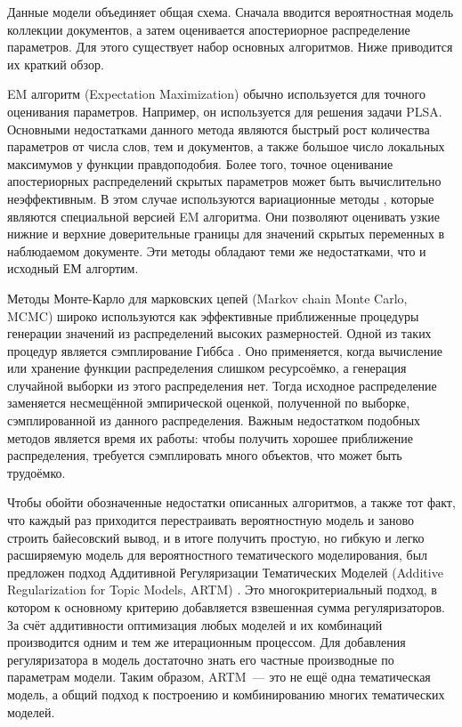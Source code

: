 \documentclass[12pt, twoside]{article}
\begin{document}
Данные модели объединяет общая схема. Сначала вводится вероятностная модель коллекции документов, а затем оценивается  апостериорное распределение  параметров. Для этого существует набор основных алгоритмов. Ниже приводится их краткий обзор.

EM алгоритм (Expectation Maximization) \cite{bilmes1998gentle} обычно используется для  точного оценивания параметров. Например, он используется для решения задачи PLSA. Основными недостатками данного метода являются быстрый рост количества параметров от числа слов, тем и документов, а также большое число локальных максимумов у функции правдоподобия. Более того, точное оценивание апостериорных распределений скрытых параметров может быть вычислительно неэффективным. В этом случае используются вариационные методы \cite{jordan1999introduction}, которые являются специальной версией EM алгоритма. Они  позволяют оценивать узкие нижние и верхние доверительные границы для значений скрытых переменных в наблюдаемом документе. Эти методы обладают теми же недостатками, что и исходный ЕМ алгортим.

Методы Монте-Карло для марковских цепей (Markov chain Monte Carlo, MCMC) \cite{gilks1996introducing,andrieu2003introduction} широко используются как эффективные приближенные процедуры генерации значений из распределений высоких размерностей. Одной из таких процедур является сэмплирование Гиббса \cite{griffiths2004finding}.  Оно применяется, когда вычисление или хранение функции распределения слишком ресурсоёмко, а генерация случайной выборки из этого распределения нет. Тогда исходное распределение заменяется несмещённой эмпирической оценкой, полученной по выборке, сэмплированной из данного распределения. Важным недостатком подобных методов является время их работы: чтобы получить хорошее приближение распределения, требуется сэмплировать много объектов, что может быть трудоёмко. 

Чтобы обойти обозначенные недостатки описанных алгоритмов, а также тот факт, что каждый раз приходится перестраивать вероятностную модель и заново строить байесовский вывод, и в итоге получить простую, но гибкую и легко расширяемую модель для вероятностного тематического моделирования, был предложен подход Аддитивной Регуляризации Тематических Моделей (Additive Regularization for Topic Models, ARTM) \cite{vorontsov2014additive,vorontsov2014tutorial,vorontsov2015additive}. Это многокритериальный подход, в котором к основному критерию добавляется взвешенная сумма регуляризаторов.  За счёт аддитивности оптимизация любых моделей и их комбинаций производится одним и тем же итерационным процессом. Для добавления регуляризатора в модель достаточно знать его частные производные по параметрам модели. Таким образом, ARTM~---  это не ещё одна тематическая модель, а общий подход к построению и комбинированию многих тематических моделей. 
\end{document}
